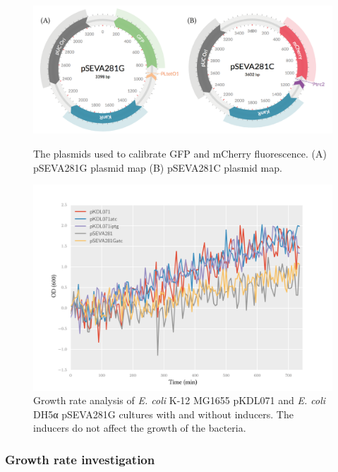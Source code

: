 \begin{figure}[p]
	\centerfloat
		\includegraphics[width=\textwidth]{../../chapters/chapterABCFlow/images/plasmids_constructed.png}
		\caption[pSEVA281G and pSEVA281C plasmid map]{\label{fig:psevas} The plasmids used to calibrate GFP and mCherry fluorescence. (A) pSEVA281G plasmid map (B) pSEVA281C plasmid map.  }


		\includegraphics[scale=0.6]{../../chapters/chapterABCFlow/images/growth_curves.png}
		\caption[Growth rate curves of cultures with and without inducers]{\label{fig:growth_curve} Growth rate analysis of \textit{E. coli} K-12 MG1655 pKDL071 and \textit{E. coli} DH5α pSEVA281G cultures with and without inducers. The inducers do not affect the growth of the bacteria. }
\end{figure}

\subsubsection{Growth rate investigation}

